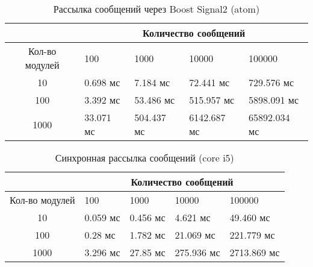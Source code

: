 \begin{table}[!htbp]
    \caption{\label{tab:atom_signals2}Рассылка сообщений через Boost Signal2 (atom)}
    \begin{center}
        \begin{tabularx}{\textwidth}{|c|X|X|X|X|}
            \hline
            & \multicolumn{4}{|c|}{Количество сообщений} \\
            \hline
            Кол-во модулей & 100   & 1000   & 10000   & 100000   \\
            \hline
            10             & 0.698 мс  & 7.184 мс  & 72.441 мс & 729.576 мс   \\
            \hline
            100            & 3.392 мс  & 53.486 мс  & 515.957 мс  & 5898.091 мс  \\
            \hline
            1000           & 33.071 мс & 504.437 мс & 6142.687 мс & 65892.034 мс \\
            \hline
        \end{tabularx}
    \end{center}
\end{table}


\begin{table}[!htbp]
    \caption{\label{tab:core_rrc_old}Синхронная рассылка сообщений (core i5)}
    \begin{center}
        \begin{tabularx}{\textwidth}{|c|X|X|X|X|}
            \hline
            & \multicolumn{4}{|c|}{Количество сообщений} \\
            \hline
            Кол-во модулей & 100   & 1000   & 10000   & 100000   \\
            \hline
            10             & 0.059 мс  & 0.456 мс   & 4.621 мс   & 49.460 мс   \\
            \hline
            100            & 0.28 мс  & 1.782 мс  & 21.069 мс  & 221.779 мс  \\
            \hline
            1000           & 3.296 мс & 27.85 мс & 275.936 мс & 2713.869 мс \\
            \hline
        \end{tabularx}
    \end{center}
\end{table}


